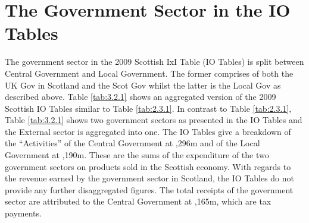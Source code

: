 \newpage



\section{The Government Sector in the IO Tables}
\label{sec:3.2}

The government sector in the 2009 Scottish IxI Table (IO Tables) is split between Central Government and Local Government. The former comprises of both the UK Gov in Scotland and the Scot Gov whilst the latter is the Local Gov as described above. Table \ref{tab:3.2.1} shows an aggregated version of the 2009 Scottish IO Tables similar to Table \ref{tab:2.3.1}. In contrast to Table \ref{tab:2.3.1}, Table \ref{tab:3.2.1} shows two government sectors as presented in the IO Tables and the External sector is aggregated into one. The IO Tables give a breakdown of the ``Activities'' of the Central Government at ,296m and of the Local Government at  ,190m. These are the sums of the expenditure of the two government sectors on products sold in the Scottish economy. With regards to the revenue earned by the government sector in Scotland, the IO Tables do not provide any further disaggregated figures. The total receipts of the government sector are attributed to the Central Government at ,165m, which are tax payments.


\bigskip

